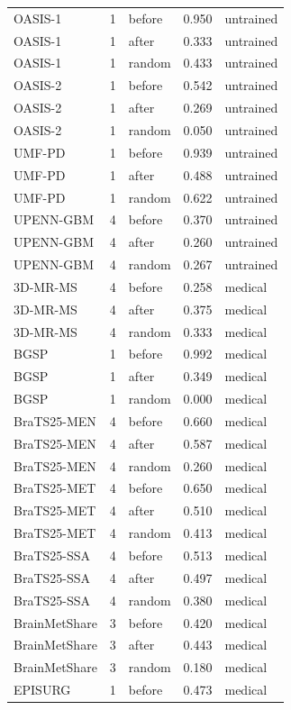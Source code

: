 \begin{tabular}{lrlrl}
OASIS-1 & 1 & before & 0.950 & untrained \\
OASIS-1 & 1 & after & 0.333 & untrained \\
OASIS-1 & 1 & random & 0.433 & untrained \\
OASIS-2 & 1 & before & 0.542 & untrained \\
OASIS-2 & 1 & after & 0.269 & untrained \\
OASIS-2 & 1 & random & 0.050 & untrained \\
UMF-PD & 1 & before & 0.939 & untrained \\
UMF-PD & 1 & after & 0.488 & untrained \\
UMF-PD & 1 & random & 0.622 & untrained \\
UPENN-GBM & 4 & before & 0.370 & untrained \\
UPENN-GBM & 4 & after & 0.260 & untrained \\
UPENN-GBM & 4 & random & 0.267 & untrained \\
3D-MR-MS & 4 & before & 0.258 & medical \\
3D-MR-MS & 4 & after & 0.375 & medical \\
3D-MR-MS & 4 & random & 0.333 & medical \\
BGSP & 1 & before & 0.992 & medical \\
BGSP & 1 & after & 0.349 & medical \\
BGSP & 1 & random & 0.000 & medical \\
BraTS25-MEN & 4 & before & 0.660 & medical \\
BraTS25-MEN & 4 & after & 0.587 & medical \\
BraTS25-MEN & 4 & random & 0.260 & medical \\
BraTS25-MET & 4 & before & 0.650 & medical \\
BraTS25-MET & 4 & after & 0.510 & medical \\
BraTS25-MET & 4 & random & 0.413 & medical \\
BraTS25-SSA & 4 & before & 0.513 & medical \\
BraTS25-SSA & 4 & after & 0.497 & medical \\
BraTS25-SSA & 4 & random & 0.380 & medical \\
BrainMetShare & 3 & before & 0.420 & medical \\
BrainMetShare & 3 & after & 0.443 & medical \\
BrainMetShare & 3 & random & 0.180 & medical \\
EPISURG & 1 & before & 0.473 & medical \\

\end{tabular}
